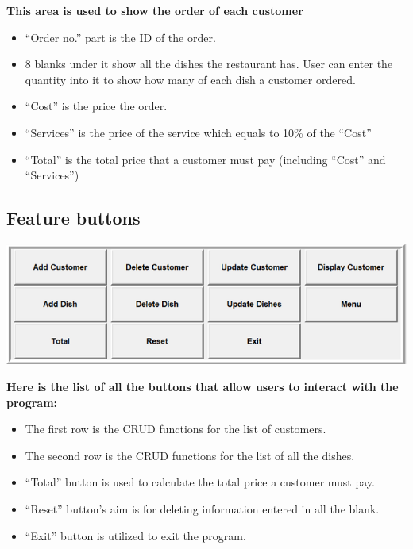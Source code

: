 \vspace{1cm}
\textbf{This area is used to show the order of each customer}
\begin{itemize}
    \item “Order no.” part is the ID of the order. 
    \item 8 blanks under it show all the dishes the restaurant has. User can enter the quantity into it to show how many of each dish a customer ordered. 
    \item “Cost” is the price the order. 
    \item “Services” is the price of the service which equals to 10\% of the “Cost”
    \item “Total” is the total price that a customer must pay (including “Cost” and “Services”)
\end{itemize}

\newpage
\subsection{Feature buttons}
\vspace{1cm}
\includegraphics{images/feature button.png}

\vspace{0.5cm}
\textbf{Here is the list of all the buttons that allow users to interact with the program:}
\vspace{0.5cm}

\begin{itemize}
    \item The first row is the CRUD functions for the list of customers.
    \item The second row is the CRUD functions for the list of all the dishes.
    \item “Total” button is used to calculate the total price a customer must pay.
    \item “Reset” button’s aim is for deleting information entered in all the blank.
    \item “Exit” button is utilized to exit the program.
\end{itemize}

